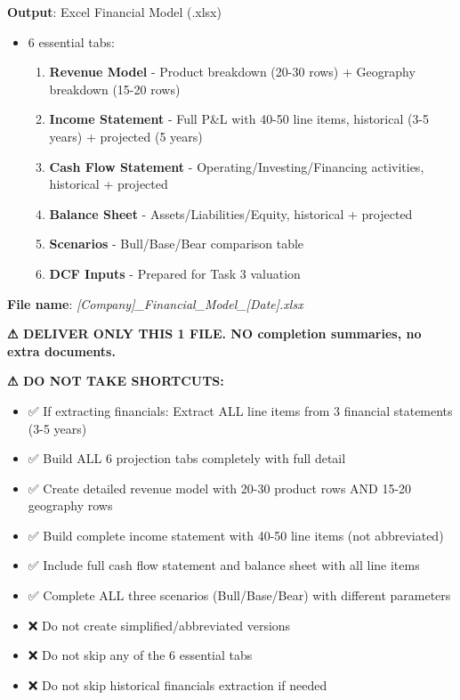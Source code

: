 \documentclass[11pt]{article}
\begin{document}
\textbf{Output}: Excel Financial Model (.xlsx)

\begin{itemize}[leftmargin=*,itemsep=2pt,topsep=2pt]
\item {} 6 essential tabs:
\begin{enumerate}[leftmargin=*,itemsep=2pt,topsep=2pt]
\item {} \textbf{Revenue Model} - Product breakdown (20-30 rows) + Geography breakdown (15-20 rows)
\item {} \textbf{Income Statement} - Full P\&L with 40-50 line items, historical (3-5 years) + projected (5 years)
\item {} \textbf{Cash Flow Statement} - Operating/Investing/Financing activities, historical + projected
\item {} \textbf{Balance Sheet} - Assets/Liabilities/Equity, historical + projected
\item {} \textbf{Scenarios} - Bull/Base/Bear comparison table
\item {} \textbf{DCF Inputs} - Prepared for Task 3 valuation
\end{enumerate}
\end{itemize}

\textbf{File name}: \emph{[Company]\_\allowbreak{}Financial\_\allowbreak{}Model\_\allowbreak{}[Date].xlsx}


\textbf{⚠ DELIVER ONLY THIS 1 FILE. NO completion summaries, no extra documents.}


\textbf{⚠ DO NOT TAKE SHORTCUTS:}

\begin{itemize}[leftmargin=*,itemsep=2pt,topsep=2pt]
\item {} ✅ If extracting financials: Extract ALL line items from 3 financial statements (3-5 years)
\item {} ✅ Build ALL 6 projection tabs completely with full detail
\item {} ✅ Create detailed revenue model with 20-30 product rows AND 15-20 geography rows
\item {} ✅ Build complete income statement with 40-50 line items (not abbreviated)
\item {} ✅ Include full cash flow statement and balance sheet with all line items
\item {} ✅ Complete ALL three scenarios (Bull/Base/Bear) with different parameters
\item {} ❌ Do not create simplified/abbreviated versions
\item {} ❌ Do not skip any of the 6 essential tabs
\item {} ❌ Do not skip historical financials extraction if needed
\end{itemize}
\end{document}
